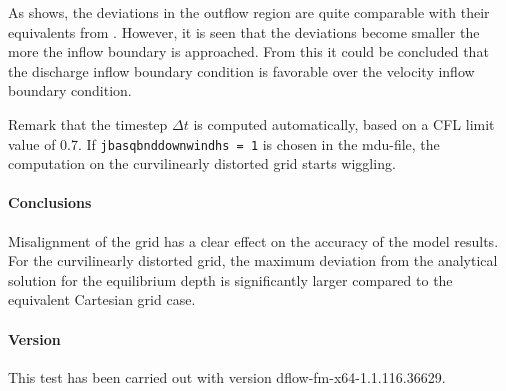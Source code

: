 As  shows, the deviations in the outflow region are quite comparable with their equivalents from . However, it is seen that the deviations become smaller the more the inflow boundary is approached. From this it could be concluded that the discharge inflow boundary condition is favorable over the velocity inflow boundary condition.

Remark that the timestep $\Delta t$ is computed automatically, based on a CFL limit value of 0.7. If \texttt{jbasqbnddownwindhs = 1} is chosen in the mdu-file, the computation on the curvilinearly distorted grid starts wiggling.


\paragraph*{Conclusions}
Misalignment of the grid has a clear effect on the accuracy of the model results. For the curvilinearly distorted grid, the maximum deviation from the analytical solution for the equilibrium depth is significantly larger compared to the equivalent Cartesian grid case.


\paragraph*{Version}
This test has been carried out with version dflow-fm-x64-1.1.116.36629.